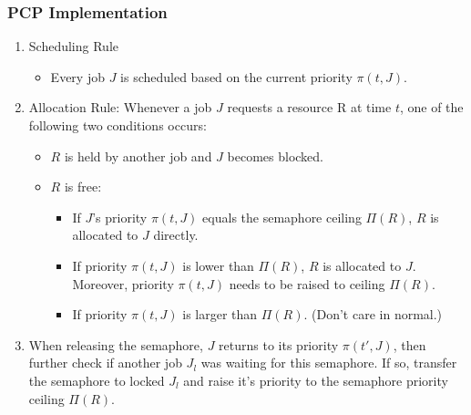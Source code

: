 \documentclass[t]{beamer}
\begin{document}
\begin{frame}
  \frametitle{PCP Implementation}
  \footnotesize
  \begin{enumerate}\small
  \item Scheduling Rule
    \begin{itemize}
    \item Every job $J$ is scheduled based on the
      current priority $\pi(t, J)$.
    \end{itemize}
  \item Allocation Rule: Whenever a job $J$ requests a resource R at
    time $t$, one of the following two conditions occurs:
    \begin{itemize}
    \item $R$ is held by another job and $J$ becomes blocked.
    \item $R$ is free:
      \begin{itemize}
      \item If $J$'s priority $\pi(t, J)$ equals the semaphore ceiling $\Pi(R)$, $R$ is allocated to $J$ directly.
      \item If priority $\pi(t, J)$ is lower than $\Pi(R)$, $R$ is allocated to
        $J$. Moreover, priority $\pi(t, J)$ needs to be raised to ceiling $\Pi(R)$.
      \item If priority $\pi(t, J)$ is larger than $\Pi(R)$. (Don't care in normal.)
      \end{itemize}
    \end{itemize}
    \item When releasing the semaphore, $J$ returns to its priority $\pi(t', J)$, then further check if another job $J_l$ was waiting for this semaphore. If so, transfer the semaphore to locked $J_l$ and raise it's priority to the semaphore priority ceiling $\Pi(R)$.
  \end{enumerate}
\end{frame}
\end{document}
